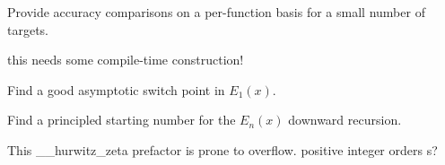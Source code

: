 
\begin{DoxyRefList}
\item[\label{todo__todo000001}%
\hypertarget{todo__todo000001}{}%
page \hyperlink{index}{Mathematical Special Functions} ]Provide accuracy comparisons on a per-\/function basis for a small number of targets. 
\item[\label{todo__todo000002}%
\hypertarget{todo__todo000002}{}%
Member \hyperlink{namespacestd_1_1____detail_a3ad3b7b4dcebdf69778dbf7a5ba2427c}{std\+:\+:\+\_\+\+\_\+detail\+:\+:\+\_\+\+\_\+dawson\+\_\+cont\+\_\+frac} (\+\_\+\+Tp \+\_\+\+\_\+x)]this needs some compile-\/time construction!  
\item[\label{todo__todo000004}%
\hypertarget{todo__todo000004}{}%
Member \hyperlink{namespacestd_1_1____detail_a665eb0c524b929c035d88bbb17815917}{std\+:\+:\+\_\+\+\_\+detail\+:\+:\+\_\+\+\_\+expint\+\_\+\+E1} (\+\_\+\+Tp \+\_\+\+\_\+x)]Find a good asymptotic switch point in $ E_1(x) $.  
\item[\label{todo__todo000003}%
\hypertarget{todo__todo000003}{}%
Member \hyperlink{namespacestd_1_1____detail_a9b0a2050324390fb6c4a584170289a99}{std\+:\+:\+\_\+\+\_\+detail\+:\+:\+\_\+\+\_\+expint\+\_\+\+En\+\_\+recursion} (unsigned int \+\_\+\+\_\+n, \+\_\+\+Tp \+\_\+\+\_\+x)]Find a principled starting number for the $ E_n(x) $ downward recursion.  
\item[\label{todo__todo000005}%
\hypertarget{todo__todo000005}{}%
Member \hyperlink{namespacestd_1_1____detail_a7eb061915bad44dd29443b3476eaa7a0}{std\+:\+:\+\_\+\+\_\+detail\+:\+:\+\_\+\+\_\+hurwitz\+\_\+zeta} (\+\_\+\+Tp \+\_\+\+\_\+s, std\+::complex$<$ \+\_\+\+Tp $>$ \+\_\+\+\_\+a)]This \+\_\+\+\_\+hurwitz\+\_\+zeta prefactor is prone to overflow. positive integer orders s? 
\end{DoxyRefList}